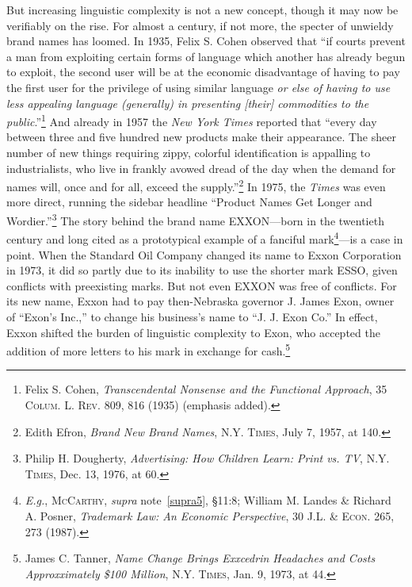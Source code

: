\documentclass[letterpaper, 11pt, oneside]{article}
\begin{document}
But increasing linguistic complexity is not a new concept, though it may now be verifiably on the rise. For almost a century, if not more, the specter of unwieldy brand names has loomed. In 1935, Felix S. Cohen observed that ``if courts prevent a man from exploiting certain forms of language which another has already begun to exploit, the second user will be at the economic disadvantage of having to pay the first user for the privilege of using similar language \textit{or else of having to use less appealing language (generally) in presenting [their] commodities to the public}.''\footnote{Felix S. Cohen, \textit{Transcendental Nonsense and the Functional Approach}, 35 \textsc{Colum. L. Rev.} 809, 816 (1935) (emphasis added).}  And already in 1957 the \textit{New York Times} reported that ``every day between three and five hundred new products make their appearance. The sheer number of new things requiring zippy, colorful identification is appalling to industrialists, who live in frankly avowed dread of the day when the demand for names will, once and for all, exceed the supply.''\footnote{Edith Efron, \textit{Brand New Brand Names}, \textsc{N.Y. Times}, July 7, 1957, at 140.} In 1975, the \textit{Times} was even more direct, running the sidebar headline ``Product Names Get Longer and Wordier.''\footnote{Philip H. Dougherty, \textit{Advertising: How Children Learn: Print vs. TV}, \textsc{N.Y. Times}, Dec. 13, 1976, at 60.} The story behind the brand name EXXON—born in the twentieth century and long cited as a prototypical example of a fanciful mark\footnote{\textit{E.g.}, \textsc{McCarthy}, \textit{supra} note~\ref{supra5}, \S 11:8; William M. Landes \& Richard A. Posner, \textit{Trademark Law: An Economic Perspective}, 30 \textsc{J.L. \& Econ.} 265, 273 (1987).}—is a case in point. When the Standard Oil Company changed its name to Exxon Corporation in 1973, it did so partly due to its inability to use the shorter mark ESSO, given conflicts with preexisting marks. But not even EXXON was free of conflicts. For its new name, Exxon had to pay then-Nebraska governor J. James Exon, owner of ``Exon's Inc.,'' to change his business's name to ``J. J. Exon Co.'' In effect, Exxon shifted the burden of linguistic complexity to Exon, who accepted the addition of more letters to his mark in exchange for cash.\footnote{James C. Tanner, \textit{Name Change Brings Exxcedrin Headaches and Costs Approxximately \$100 Million}, \textsc{N.Y. Times}, Jan. 9, 1973, at 44.}
\end{document}
